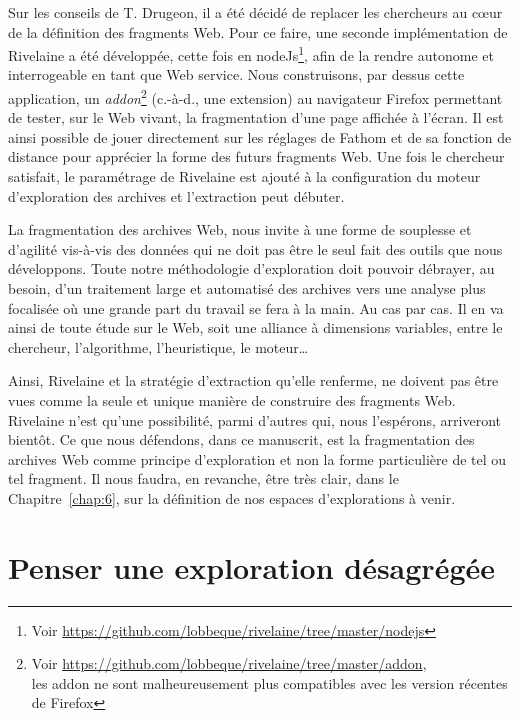 \documentclass[symmetric,justified,marginals=raggedouter]{tufte-book}
\begin{document}
Sur les conseils de T. Drugeon, il a été décidé de replacer les cher\-cheurs au cœur de la définition des fragments Web. Pour ce faire, une seconde implémentation de Rivelaine a été développée, cette fois en nodeJs\footnote{\RaggedOuter Voir \url{https://github.com/lobbeque/rivelaine/tree/master/nodejs}}, afin de la rendre autonome et interrogeable en tant que Web service. Nous construisons, par dessus cette application, un \textit{addon}\footnote{\RaggedOuter Voir \url{https://github.com/lobbeque/rivelaine/tree/master/addon},\\ les addon ne sont malheureusement plus compatibles avec les version récentes de Firefox} (c.-à-d., une extension) au navigateur Firefox permettant de tester, sur le Web vivant, la fragmentation d'une page affichée à l'écran. Il est ainsi possible de jouer directement sur les réglages de Fathom et de sa fonction de distance pour apprécier la forme des futurs fragments Web. Une fois le chercheur satisfait, le paramétrage de Rivelaine est ajouté à la configuration du moteur d'exploration des archives et l'extraction peut débuter.     

La fragmentation des archives Web, nous invite à une forme de souplesse et d'agilité vis-à-vis des données qui ne doit pas être le seul fait des outils que nous développons. Toute notre méthodologie d'exploration doit pouvoir débrayer, au besoin, d'un traitement large et automatisé des archives vers une analyse plus focalisée où une grande part du travail se fera à la main. Au cas par cas. Il en va ainsi de toute étude sur le Web, soit une alliance à dimensions variables, entre le chercheur, l'algorithme, l'heuristique, le moteur\ldots{}  

Ainsi, Rivelaine et la stratégie d'extraction qu'elle renferme, ne doi\-vent pas être vues comme la seule et unique manière de construire des fragments Web. Rivelaine n'est qu'une possibilité, parmi d'autres qui, nous l'espérons, arriveront bientôt. Ce que nous défendons, dans ce manuscrit, est la fragmentation des archives Web comme principe d'exploration et non la forme particulière de tel ou tel fragment. Il nous faudra, en revanche, être très clair, dans le Chapitre~\ref{chap:6}, sur la définition de nos espaces d'explorations à venir.    

\section{Penser une exploration désagrégée}
\label{sec:desagreger}
\end{document}
